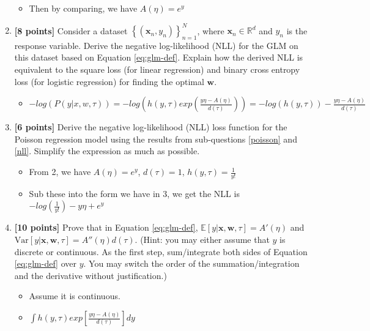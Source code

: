 \documentclass{article}
\newcommand{\Ex}[1]{\mathbb{E}\left[#1\right]}
\newcommand{\Var}[1]{\text{Var}\left[#1\right]}
\renewcommand{\bf}[1]{\mathbf{#1}}
\begin{document}
\begin{enumerate}
\begin{itemize}
        \item Then by comparing, we have $A(\eta)=e^y$
    \end{itemize}
    \item \label{nll} \textbf{[8 points]} Consider a dataset $\left\{\left(\mathbf{x}_n,y_n\right)\right\}_{n=1}^N$, where $\mathbf{x}_n\in\mathbb{R}^d$ and $y_n$ is the response variable. Derive the negative log-likelihood (NLL) for the GLM on this dataset based on Equation \eqref{eq:glm-def}. Explain how the derived NLL is equivalent to the square loss (for linear regression) and binary cross entropy loss (for logistic regression) for finding the optimal $\bf{w}$.
    \begin{itemize}
        \item $-log(P(y|x,w,\tau))=-log(h(y,\tau)exp(\frac{y\eta-A(\eta)}{d(\tau)}))=-log(h(y,\tau))-\frac{y\eta-A(\eta)}{d(\tau)}$
    \end{itemize}
    \item \textbf{[6 points]} Derive the negative log-likelihood (NLL) loss function for the Poisson regression model using the results from sub-questions \ref{poisson} and \ref{nll}. Simplify the expression as much as possible.
    \begin{itemize}
        \item From 2, we have $A(\eta)=e^y$, $d(\tau)=1$, $h(y,\tau)=\frac{1}{y!}$
        \item Sub these into the form we have in 3, we get the NLL is $-log(\frac{1}{y!})-y\eta+e^y$
    \end{itemize}
    \item \textbf{[10 points]} Prove that in Equation \eqref{eq:glm-def}, $\Ex{y|\bf{x}, \bf{w}, \tau} = A'(\eta)$ and $\Var{y|\bf{x}, \bf{w}, \tau} = A''(\eta)d(\tau)$. (Hint: you may either assume that $y$ is discrete or continuous. As the first step, sum/integrate both sides of Equation \eqref{eq:glm-def} over $y$. You may switch the order of the summation/integration and the derivative without justification.)
    \begin{itemize}
        \item Assume it is continuous.
        \item $\int{h(y,\tau)exp[\frac{y\eta - A(\eta)}{d(\tau)}] dy}$
    \end{itemize}
\end{enumerate}

\newpage
\end{document}

